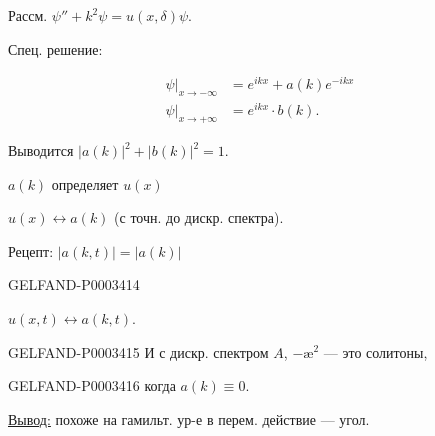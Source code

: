 Рассм. $\psi''+k^2\psi=u(x,\delta)\psi$.

Спец. решение:

\begin{equation*}\begin{aligned}\psi|_{x\to-\infty}&=e^{ikx}+a(k)e^{-ikx}\\\psi|_{x\to+\infty}&=e^{ikx}\cdot b(k).\end{aligned}\end{equation*}

Выводится $|a(k)|^2+|b(k)|^2=1$.

 $a(k)$ определяет $u(x)$

$u(x)\longleftrightarrow a(k)$ (с точн. до дискр. спектра).

Рецепт: $|a(k,t)|=|a(k)|$

\begin{GelfandAdjacentEvidence}{GELFAND-P000341}{4}

\end{GelfandAdjacentEvidence}


$u(x,t)\longleftrightarrow a(k,t)$.

\begin{GelfandAdjacentEvidence}{GELFAND-P000341}{5}
И с дискр. спектром $A$, $-\text{æ}^2$ --- это солитоны,

\end{GelfandAdjacentEvidence}


\begin{GelfandAdjacentEvidence}{GELFAND-P000341}{6}
когда $a(k)\equiv0$.

\end{GelfandAdjacentEvidence}




\uline{Вывод:} похоже на гамильт. ур-е в перем. действие --- угол.

